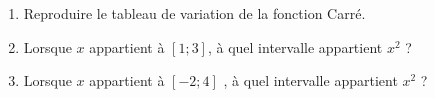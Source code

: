 
\begin{enumerate}
\item Reproduire le tableau de variation de la fonction Carré.
\item Lorsque $x$ appartient à $[1;3]$, à quel intervalle appartient $x^2$ ?
\item Lorsque $x$ appartient à $[-2;4]$ , à quel intervalle appartient $x^2$ ?
\end{enumerate}